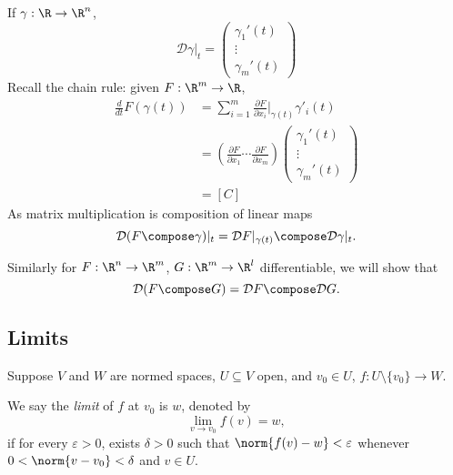 \documentclass[a4paper]{article}
\newcommand*{\D}{\mathcal{D}}
\theoremstyle{definition}
\begin{document}
\begin{eg}
  If \(\gamma: \R \to \R^n\),
  \[
    \D \gamma|_t =
    \begin{pmatrix}
      \gamma_1'(t) \\
      \vdots \\
      \gamma_m'(t)
    \end{pmatrix}
  \]
  Recall the chain rule: given \(F: \R^m \to \R\),
  \begin{align*}
    \frac{d}{dt} F(\gamma(t)) &= \sum_{i = 1}^{m} \frac{\partial F}{\partial x_i} \Big|_{\gamma(t)} \gamma'_i(t) \\
                              &=
                                  \left( \frac{\partial F}{\partial x_1}  \cdots \frac{\partial F}{\partial x_m} \right)
                                \begin{pmatrix}
                                  \gamma_1'(t) \\
                                  \vdots \\
                                  \gamma_m'(t)
                                \end{pmatrix} \\
                              &= [C]
  \end{align*}
  As matrix multiplication is composition of linear maps
  \[
    \D( F \compose \gamma)|_t = \D F|_{\gamma(t)} \compose \D \gamma|_t.
  \]
\end{eg}

Similarly for \(F: \R^n \to \R^m\), \(G: \R^m \to \R^l\) differentiable, we will show that
\[
    \D( F \compose G) = \D F \compose \D G.
\]

\subsection{Limits}

Suppose \(V\) and \(W\) are normed spaces, \(U \subseteq V\) open, and \(v_0 \in U\), \(f: U \setminus \{v_0\} \to W\).

\begin{definition}[Limit]
  We say the \emph{limit} of \(f\) at \(v_0\) is \(w\), denoted by
  \[
    \lim_{v \to v_0} f(v) = w,
  \]
  if for every \(\varepsilon > 0\), exists \(\delta > 0\) such that \(\norm{f(v) - w} < \varepsilon\) whenever \( 0 < \norm{v - v_0} < \delta\) and \(v \in U\).
\end{definition}
\end{document}
